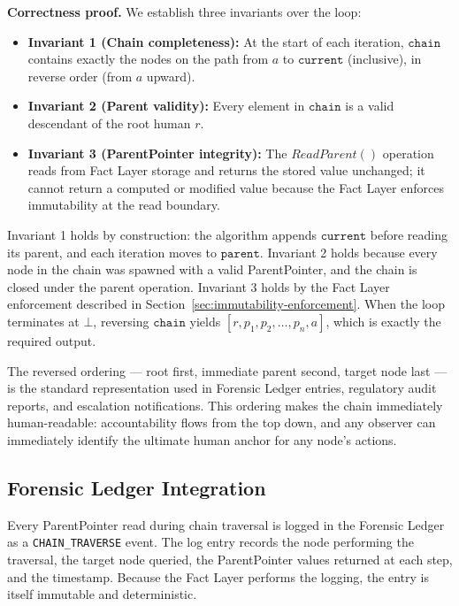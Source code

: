 \textbf{Correctness proof.} We establish three invariants over the loop:
\begin{itemize}[noitemsep]
    \item \textbf{Invariant 1 (Chain completeness):} At the start of each iteration, $\texttt{chain}$ contains exactly the nodes on the path from $a$ to $\texttt{current}$ (inclusive), in reverse order (from $a$ upward).
    \item \textbf{Invariant 2 (Parent validity):} Every element in $\texttt{chain}$ is a valid descendant of the root human $r$.
    \item \textbf{Invariant 3 (ParentPointer integrity):} The $\textit{ReadParent}()$ operation reads from Fact Layer storage and returns the stored value unchanged; it cannot return a computed or modified value because the Fact Layer enforces immutability at the read boundary.
\end{itemize}
Invariant 1 holds by construction: the algorithm appends $\texttt{current}$ before reading its parent, and each iteration moves to $\texttt{parent}$. Invariant 2 holds because every node in the chain was spawned with a valid ParentPointer, and the chain is closed under the parent operation. Invariant 3 holds by the Fact Layer enforcement described in Section~\ref{sec:immutability-enforcement}. When the loop terminates at $\bot$, reversing $\texttt{chain}$ yields $[r, p_1, p_2, \dots, p_n, a]$, which is exactly the required output.

The reversed ordering --- root first, immediate parent second, target node last --- is the standard representation used in Forensic Ledger entries, regulatory audit reports, and escalation notifications. This ordering makes the chain immediately human-readable: accountability flows from the top down, and any observer can immediately identify the ultimate human anchor for any node's actions.

\subsection{Forensic Ledger Integration}

Every ParentPointer read during chain traversal is logged in the Forensic Ledger as a \texttt{CHAIN\_TRAVERSE} event. The log entry records the node performing the traversal, the target node queried, the ParentPointer values returned at each step, and the timestamp. Because the Fact Layer performs the logging, the entry is itself immutable and deterministic.

